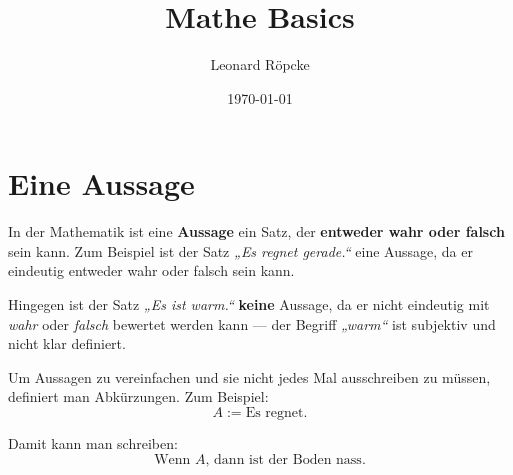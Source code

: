 \documentclass[12pt,a4paper]{article}
\title{Mathe Basics}
\author{Leonard Röpcke}
\date{\today}
\begin{document}
\maketitle
\tableofcontents
\newpage

\section{Eine Aussage}

In der Mathematik ist eine \textbf{Aussage} ein Satz, der \textbf{entweder wahr oder falsch} sein kann. 
Zum Beispiel ist der Satz 
\textit{„Es regnet gerade.“} 
eine Aussage, da er eindeutig entweder wahr oder falsch sein kann.

Hingegen ist der Satz 
\textit{„Es ist warm.“} 
\textbf{keine} Aussage, da er nicht eindeutig mit \textit{wahr} oder \textit{falsch} bewertet werden kann — 
der Begriff \textit{„warm“} ist subjektiv und nicht klar definiert.

Um Aussagen zu vereinfachen und sie nicht jedes Mal ausschreiben zu müssen, 
definiert man Abkürzungen. Zum Beispiel:
\[
A := \text{Es regnet.}
\]

Damit kann man schreiben:
\[
\text{Wenn } A \text{, dann ist der Boden nass.}
\]
\end{document}
